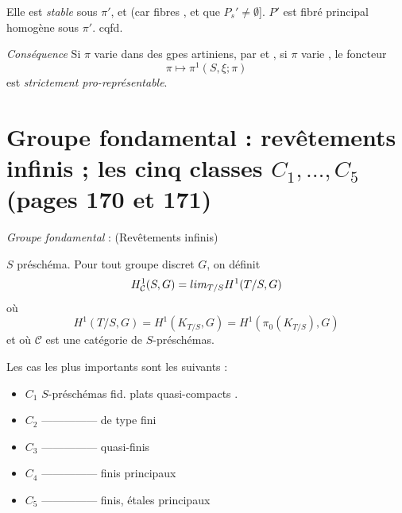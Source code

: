 \documentclass[11pt,a4paper]{article}
\begin{document}
Elle est \emph{stable} sous $\pi'$, et \ill{}  (car
\ill{} \ill{} fibres , et \ill{} que
$P_s' \neq \emptyset$]. \ill{} $P'$ est \ill{} fibré principal homogène
sous $\pi'$. cqfd.


\emph{Conséquence} Si $\pi$ varie dans  
 \ill{} des gpes artiniens, \struck{\ill{}}
 par  et ,
\ill{} si $\pi$ varie \ill{} \ill{} , \ill{}
\ill{} le foncteur
\[
  \pi \longmapsto \pi^1(S,\xi;\pi)
\]
est \emph{strictement pro-représentable}.

\section*{Groupe fondamental : revêtements infinis ; les cinq classes $C_1, \ldots, C_5$ (pages 170 et 171)}


\emph{Groupe fondamental} : (Revêtements infinis)

$S$ préschéma. Pour tout groupe discret $G$, on définit
\[
  H^1_{\mathcal{C}}(S,G) = \varinjlim_{T/S} H^1(T/S, G)
\]
où
\[
  H^1(T/S, G) = H^1(K_{T/S}, G) = H^1(\pi_0(K_{T/S}), G)
\]
et où $\mathcal{C}$ est une catégorie de $S$-préschémas.


Les cas les plus importants sont les suivants :

\begin{itemize}
\item[(i)] $C_1$ \quad $S$-préschémas fid. plats quasi-compacts
\struck{\ill{}}.
\item[(ii)] $C_2$ \quad ————— de type fini
\item[(iii)] $C_3$ \quad ————— quasi-finis
\item[(iv)] $C_4$ \quad ————— finis principaux
\item[(v)] $C_5$ \quad —————  finis, étales
principaux %
\end{itemize}
\end{document}
